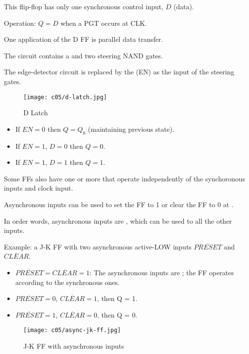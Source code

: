     \par This flip-flop has only one synchronous control input, $D$ (data).
    \par Operation: $Q = D$ when a PGT occurs at CLK.

    \par One application of the D FF is parallel data transfer.


    \par The circuit contains a  and two steering NAND gates.
    \par The edge-detector circuit is replaced by the  (EN)
    as the input of the steering gates.
    \begin{figure}[H]
      \centering
      \texttt{[image: c05/d-latch.jpg]}
      \caption{D Latch}
    \end{figure}

    \begin{itemize}
      \item If $EN = 0$ then $Q = Q_{0}$ (maintaining previous state).
      \item If $EN = 1$, $D = 0$ then $Q = 0$.
      \item If $EN = 1$, $D = 1$ then $Q = 1$.
    \end{itemize}


    \par Some FFs also have one or more  that operate
      independently of the synchoronous inputs and clock input.
    \par Asynchronous inputs can be used to set the FF to 1 or clear the FF
      to 0 at .
    \par In order words, asynchronous inputs are , which
      can be used to  all the other inputs.

    \par Example: a J-K FF with two asynchronous active-LOW inputs
    $\overline{PRESET}$ and $\overline{CLEAR}$.
    \begin{itemize}
      \item $\overline{PRESET} = \overline{CLEAR} = 1$:
        The asynchronous inputs are ; the FF operates according to
        the synchronous ones.
      \item $\overline{PRESET} = 0$, $\overline{CLEAR} = 1$, then Q = 1.
      \item $\overline{PRESET} = 1$, $\overline{CLEAR} = 0$, then Q = 0.
    \end{itemize}
  \begin{figure}[H]
    \centering
    \texttt{[image: c05/async-jk-ff.jpg]}
    \caption{J-K FF with asynchronous inputs}
  \end{figure}

